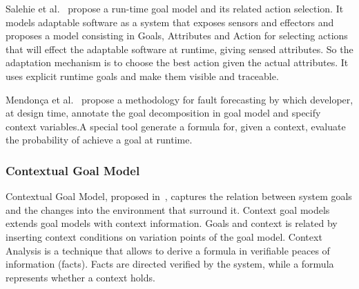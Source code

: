Salehie et al.~\cite{salehie_towards_2012} propose a run-time goal model and its related action selection. It models adaptable software as a system that exposes sensors and effectors and  proposes a model consisting in Goals, Attributes and Action for selecting actions that will effect the adaptable software at runtime, giving sensed attributes.
So the adaptation mechanism is to choose the best action given the actual attributes.
It uses explicit runtime goals and make them visible and traceable.

Mendonça et al.~\cite{mendonca_dependability_2015} propose a methodology for fault forecasting by which developer, at design time, annotate the goal decomposition in goal model and specify context variables.A special tool generate a formula for, given a context, evaluate the probability of achieve a goal at runtime.

\subsubsection{Contextual Goal Model}

Contextual Goal Model, proposed in~\cite{ali_goal-based_2010}, captures the relation between system goals and the changes into the environment that surround it. Context goal models extends goal models with context information. Goals and context is related by inserting context conditions on variation points of the goal model. Context Analysis is a technique that allows to derive a formula in verifiable peaces of information (facts). Facts are directed verified by the system, while a formula represents whether a context holds.
